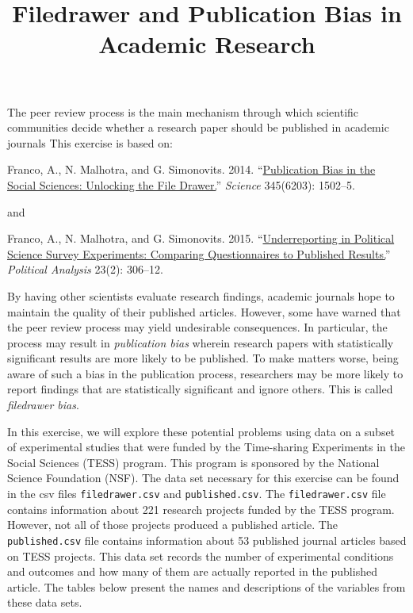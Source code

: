 \documentclass[]{article}
\title{Filedrawer and Publication Bias in Academic Research}
\author{}
\date{}
\begin{document}
\maketitle


The peer review process is the main mechanism through which scientific
communities decide whether a research paper should be published in
academic journals This exercise is based on:

Franco, A., N. Malhotra, and G. Simonovits. 2014.
``\href{http://dx.doi.org/10.1126/science.1255484}{Publication Bias in
the Social Sciences: Unlocking the File Drawer.}'' \emph{Science}
345(6203): 1502--5.

and

Franco, A., N. Malhotra, and G. Simonovits. 2015.
``\href{http://dx.doi.org/10.1093/pan/mpv006}{Underreporting in
Political Science Survey Experiments: Comparing Questionnaires to
Published Results.}'' \emph{Political Analysis} 23(2): 306--12.

By having other scientists evaluate research findings, academic journals
hope to maintain the quality of their published articles. However, some
have warned that the peer review process may yield undesirable
consequences. In particular, the process may result in \emph{publication
bias} wherein research papers with statistically significant results are
more likely to be published. To make matters worse, being aware of such
a bias in the publication process, researchers may be more likely to
report findings that are statistically significant and ignore others.
This is called \emph{filedrawer bias}.

In this exercise, we will explore these potential problems using data on
a subset of experimental studies that were funded by the Time-sharing
Experiments in the Social Sciences (TESS) program. This program is
sponsored by the National Science Foundation (NSF). The data set
necessary for this exercise can be found in the csv files
\texttt{filedrawer.csv} and \texttt{published.csv}. The
\texttt{filedrawer.csv} file contains information about 221 research
projects funded by the TESS program. However, not all of those projects
produced a published article. The \texttt{published.csv} file contains
information about 53 published journal articles based on TESS projects.
This data set records the number of experimental conditions and outcomes
and how many of them are actually reported in the published article. The
tables below present the names and descriptions of the variables from
these data sets.
\end{document}

